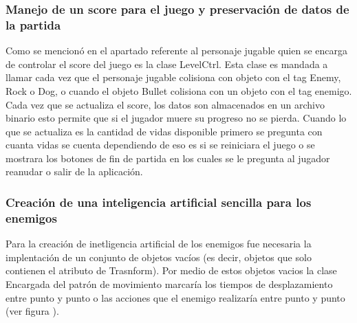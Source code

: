  \subsubsection{Manejo de un score para el juego y preservación de datos de la partida}
 Como se mencionó en el apartado referente al personaje jugable quien se encarga 
 de controlar el score del juego es la clase LevelCtrl. Esta clase es mandada a 
 llamar cada vez que el personaje jugable colisiona con objeto con el tag Enemy, 
 Rock o Dog, o cuando el objeto Bullet colisiona con un objeto con el tag enemigo. 
 Cada vez que se actualiza el score, los datos son almacenados en un archivo 
 binario esto permite que si el jugador muere su progreso no se pierda. Cuando 
 lo que se actualiza es la cantidad de vidas disponible primero se pregunta con 
 cuanta vidas se cuenta  dependiendo de eso es si se reiniciara el juego o se mostrara 
 los botones de fin de partida en los cuales se le pregunta al jugador reanudar o 
 salir de la aplicación.   
 
 \subsubsection{Creación de una inteligencia artificial sencilla para los enemigos}
 Para la creación de inetligencia artificial de los enemigos fue necesaria 
 la implentación de un conjunto de objetos vacíos (es decir, objetos que solo 
 contienen el atributo de Trasnform). Por medio de estos objetos vacios la clase 
 Encargada del patrón de movimiento marcaría los tiempos de desplazamiento entre 
 punto y punto o las acciones que el enemigo realizaría entre punto y punto (ver figura ).  

